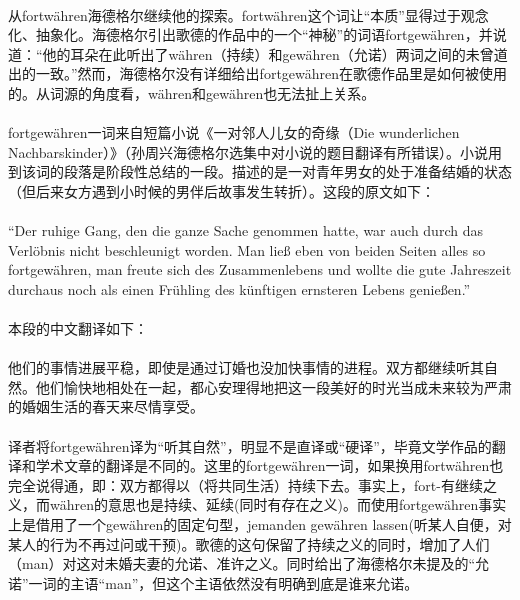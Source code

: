 \documentclass{article}
\begin{document}
			\paragraph{}
		从fortwähren海德格尔继续他的探索。fortwähren这个词让“本质”显得过于观念化、抽象化。海德格尔引出歌德的作品中的一个“神秘”的词语fortgewähren，并说道：“他的耳朵在此听出了währen（持续）和gewähren（允诺）两词之间的未曾道出的一致。”然而，海德格尔没有详细给出fortgewähren在歌德作品里是如何被使用的。从词源的角度看，währen和gewähren也无法扯上关系。
			\paragraph{}
		fortgewähren一词来自短篇小说《一对邻人儿女的奇缘（Die wunderlichen Nachbarskinder）》（孙周兴海德格尔选集中对小说的题目翻译有所错误）。小说用到该词的段落是阶段性总结的一段。描述的是一对青年男女的处于准备结婚的状态（但后来女方遇到小时候的男伴后故事发生转折）。这段的原文如下：
			\paragraph{}
		“Der ruhige Gang, den die ganze Sache genommen hatte, war auch durch das Verlöbnis nicht beschleunigt worden. Man ließ eben von beiden Seiten alles so fortgewähren, man freute sich des Zusammenlebens und wollte die gute Jahreszeit durchaus noch als einen Frühling des künftigen ernsteren Lebens genießen.”\cite{wNachbarK_Goet}
			\paragraph{}
		本段的中文翻译如下：\cite{wNachbarK_trans}
			\paragraph{}
		他们的事情进展平稳，即使是通过订婚也没加快事情的进程。双方都继续听其自然。他们愉快地相处在一起，都心安理得地把这一段美好的时光当成未来较为严肃的婚姻生活的春天来尽情享受。
			\paragraph{}
		译者将fortgewähren译为“听其自然”，明显不是直译或“硬译”，毕竟文学作品的翻译和学术文章的翻译是不同的。这里的fortgewähren一词，如果换用fortwähren也完全说得通，即：双方都得以（将共同生活）持续下去。事实上，fort-有继续之义，而währen的意思也是持续、延续(同时有存在之义)。而使用fortgewähren事实上是借用了一个gewähren的固定句型，jemanden gewähren lassen(听某人自便，对某人的行为不再过问或干预)。歌德的这句保留了持续之义的同时，增加了人们（man）对这对未婚夫妻的允诺、准许之义。同时给出了海德格尔未提及的“允诺”一词的主语“man”，但这个主语依然没有明确到底是谁来允诺。
\end{document}
